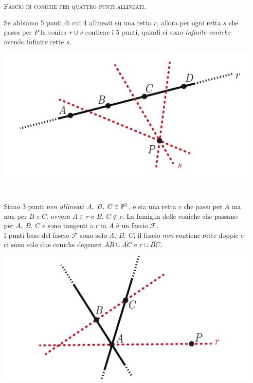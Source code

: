 \begin{example}\textsc{Fascio di coniche per quattro punti allineati}.\\
	\begin{minipage}{0.69\textwidth}
	\vspace{-3mm}Se abbiamo 5 punti di cui 4 allineati su una retta $r$, allora per ogni retta $s$ che passa per $P$ la conica $r\cup s$ contiene i 5 punti, quindi ci sono \textit{infinite coniche} avendo infinite rette $s$.
	\end{minipage}
	\begin{minipage}{0.3\textwidth}
		\includegraphics[trim=0cm 0cm 0cm 0cm,clip,scale=0.50]{images/fourpointconic.pdf}
	\end{minipage}
\end{example}
\begin{proposition}~{}\\
	\begin{minipage}{0.72\textwidth}
	\vspace{-3mm}Siano 3 punti \textit{non allineati} $A,\ B,\ C\in\proj[2]{\ }$, e sia una retta $r$ che passi per $A$ ma non per $B$ e $C$, ovvero $A\in r$ e $B,\ C\notin r$. La famiglia delle coniche che passano per $A,\ B,\ C$ e sono tangenti a $r$ in $A$ è un fascio $\mathcal{F}$.\\
	I punti base del fascio $\mathcal{F}$ sono solo $A,\ B,\ C$; il fascio \textit{non} contiene rette doppie e ci sono solo due coniche degeneri $\overline{AB}\cup\overline{AC}$ e $r\cup\overline{BC}$.
	\end{minipage}
	\hspace{-2mm}
	\begin{minipage}{0.27\textwidth}
		\includegraphics[trim=0cm 0cm 0cm 0cm,clip,scale=0.50]{images/fourpointconic2.pdf}
	\end{minipage}
\end{proposition}
